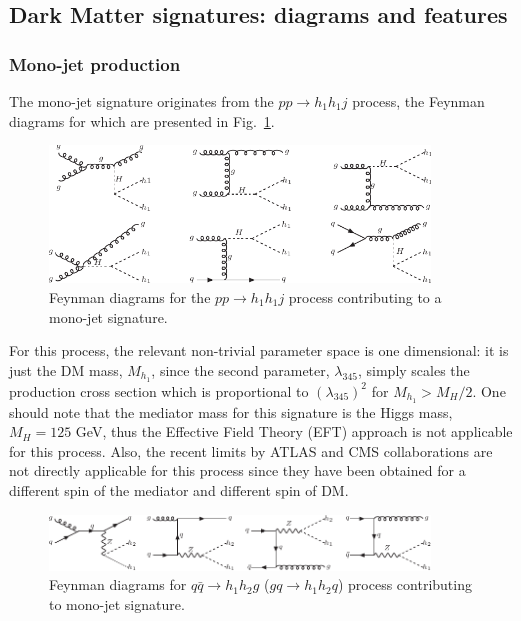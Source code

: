 \documentclass[12pt,a4paper]{article}
\begin{document}
\subsection{Dark Matter signatures: diagrams and features} \label{sec:DMsignatures}

\subsubsection{Mono-jet production}

The mono-jet signature originates from the $pp\to h_1 h_1j$ process,
the Feynman diagrams for which are presented in Fig.~\ref{fig:fd-monojet1}.
\begin{figure}[htb!]
\begin{center}
\includegraphics[width=0.9\textwidth]{fd-mono-j1.pdf} 
\caption{Feynman diagrams for the $pp\to h_1 h_1j$ process
contributing to a mono-jet signature.}
\label{fig:fd-monojet1}
\end{center}
\end{figure}
For this process, the relevant non-trivial  parameter space is  one dimensional:
it is just the DM mass, $M_{h_1}$,  since the second parameter, $\lambda_{345}$,
simply scales the production cross section which is proportional to  $(\lambda_{345})^2$
for $M_{h_1}>M_H/2$.
One should note  that the mediator mass for this signature is the Higgs mass, $M_H = 125$ GeV, thus
the Effective Field Theory (EFT) approach is not applicable for this process. Also, the recent limits by ATLAS
\cite{Diehl:2014dda} and CMS \cite{Chatrchyan:2012me, Khachatryan:2014rra} collaborations  are not directly
applicable for this process since they have been obtained for a different spin of the mediator and different
spin of DM. 

\begin{figure}[htb!]
\begin{center}
\includegraphics[width=0.9\textwidth]{fd-mono-j2.pdf} 
\caption{Feynman diagrams for $q\bar{q}\to h_1 h_2g$ ($gq\to h_1 h_2q$) process 
contributing to mono-jet signature.}
\label{fig:fd-monojet2}
\end{center}
\end{figure}
\end{document}
